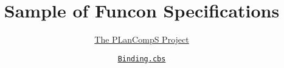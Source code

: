\documentclass[fleqn]{article}
\title{Sample of Funcon Specifications}
\author{\href{https://plancomps.github.io}{The PLanCompS Project}}
\date{\href{https://github.com/plancomps/CBS-beta/blob/master/Funcons-beta/Computations/Normal/Binding/Binding.cbs}{\texttt{Binding.cbs}}}
\begin{document}
\maketitle
\NOHYPER

\end{document}
